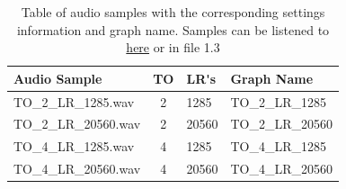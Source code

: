 \documentclass[../../main.tex]{subfiles}
\begin{document}
				\begin{table}
				\begin{center}
					\begin{tabular}{|l | c | l | l|}
					\hline
					\textbf{Audio Sample} & \textbf{\ac{TO}} & \textbf{\ac{LR's}} & \textbf{Graph Name}\\ \hline
					TO\_2\_LR\_1285.wav & 2 & 1285 & TO\_2\_LR\_1285 \\
					TO\_2\_LR\_20560.wav & 2 & 20560 & TO\_2\_LR\_20560 \\
					TO\_4\_LR\_1285.wav & 4 & 1285 & TO\_4\_LR\_1285\\
					TO\_4\_LR\_20560.wav & 4 & 20560 & TO\_4\_LR\_20560 \\ \hline
					\end{tabular}
				\end{center}
				\caption{Table of audio samples with the corresponding settings information and graph name. Samples can be listened to \href{http://lt669.github.io/pages/audioSamples.html}{here} or in file 1.3}
				\label{odeonSettingsTable}
				\end{table}
\end{document}
